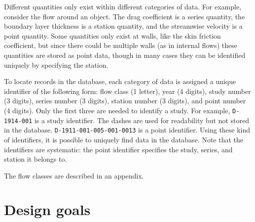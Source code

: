 Different quantities only exist within different categories of data.  For
example, consider the flow around an object.  The drag coefficient is a series
quantity, the boundary layer thickness is a station quantity, and the
streamwise velocity is a point quantity.  Some quantities only exist at walls,
like the skin friction coefficient, but since there could be multiple walls (as
in internal flows) these quantities are stored as point data, though in many
cases they can be identified uniquely by specifying the station.

To locate records in the database, each category of data is assigned a unique
identifier of the following form: flow class (1 letter), year (4 digits), study
number (3 digits), series number (3 digits), station number (3 digits), and
point number (4 digits).  Only the first three are needed to identify a study.
For example, \texttt{D-1914-001} is a study identifier.  The dashes are used
for readability but not stored in the database.
\texttt{D-1911-001-005-001-0013} is a point identifier.  Using these kind of
identifiers, it is possible to uniquely find data in the database.  Note that
the identifiers are systematic: the point identifier specifies the study,
series, and station it belongs to.

The flow classes are described in an appendix.


\section{Design goals}


